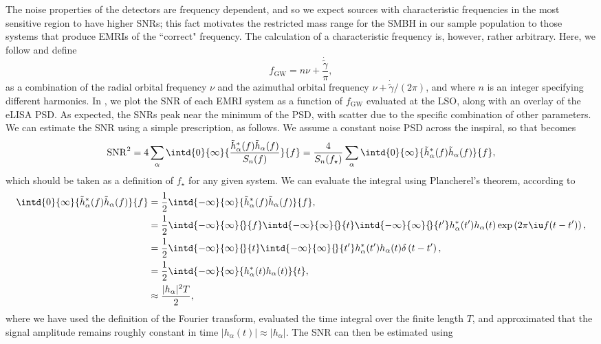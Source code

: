 The noise properties of the detectors are frequency dependent, and so we expect sources with characteristic frequencies in the most sensitive region to have higher SNRs; this fact motivates the restricted mass range for the SMBH in our sample population to those systems that produce EMRIs of the ``correct" frequency. The calculation of a characteristic frequency is, however, rather arbitrary. Here, we follow \citet{barack_lisa_2004} and define
\begin{equation}
f_\mathrm{GW} = n \nu + \frac{\dot{\tilde{\gamma}}}{\pi},
\end{equation}
as a combination of the radial orbital frequency $\nu$ and the azimuthal orbital frequency $\nu + \dot{\tilde{\gamma}}/(2\pi)$, and where $n$ is an integer specifying different harmonics. In , we plot the SNR of each EMRI system as a function of $f_\mathrm{GW}$ evaluated at the LSO, along with an overlay of the eLISA PSD. As expected, the SNRs peak near the minimum of the PSD, with scatter due to the specific combination of other parameters. We can estimate the SNR using a simple prescription, as follows. We assume a constant noise PSD across the inspiral, so that  becomes
\begin{equation}
\mathrm{SNR}^2 = 4\sum_{\alpha}\intd{0}{\infty}{\frac{\tilde{h}_{\alpha}^*(f) \tilde{h}_{\alpha}(f)}{S_n(f)}}{f} = \frac{4}{S_n(f_\star)}\sum_{\alpha}\intd{0}{\infty}{\tilde{h}_{\alpha}^*(f) \tilde{h}_{\alpha}(f)}{f},
\end{equation}
which should be taken as a definition of $f_\star$ for any given system. We can evaluate the integral using Plancherel's theorem, according to
\begin{align}
\intd{0}{\infty}{\tilde{h}_{\alpha}^*(f) \tilde{h}_{\alpha}(f)}{f} &= \frac1{2} \intd{-\infty}{\infty}{\tilde{h}_{\alpha}^*(f) \tilde{h}_{\alpha}(f)}{f},\nonumber\\
&= \frac1{2}\intd{-\infty}{\infty}{\!}{f} \intd{-\infty}{\infty}{\!}{t} \intd{-\infty}{\infty}{\!}{t'} h_{\alpha}^*(t') h_{\alpha}(t) \exp\left(2\pi\iu f(t-t')\right),\nonumber\\
&= \frac1{2}\intd{-\infty}{\infty}{\!}{t} \intd{-\infty}{\infty}{\!}{t'} h_{\alpha}^*(t') h_{\alpha}(t) \delta\left(t-t'\right),\nonumber\\
&= \frac1{2}\intd{-\infty}{\infty}{h_{\alpha}^*(t) h_{\alpha}(t)}{t},\nonumber\\
&\approx \frac{|h_{\alpha}|^2 T}{2},
\end{align}
where we have used the definition of the Fourier transform, evaluated the time integral over the finite length $T$, and approximated that the signal amplitude remains roughly constant in time $|h_{\alpha}(t)| \approx |h_{\alpha}|$. The SNR can then be estimated using

